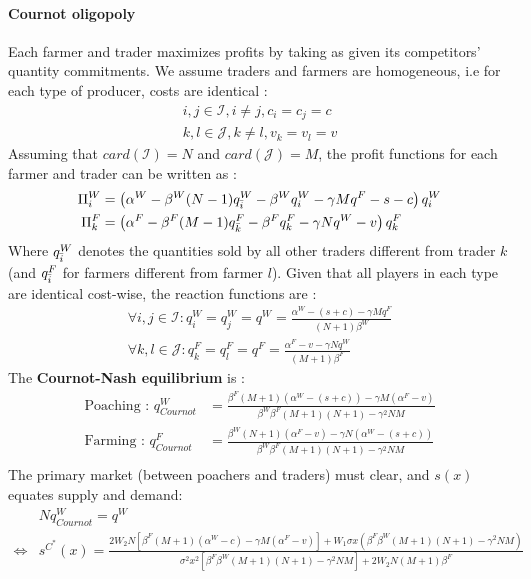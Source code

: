 \paragraph{Cournot oligopoly}
Each farmer and trader maximizes profits by taking as given its competitors' quantity commitments. We assume traders and farmers are homogeneous, i.e for each type of producer, costs are identical : 
\begin{align*}
    i,j \in \mathcal{I}, i\neq j, c_i = c_j = c\\
    k,l \in \mathcal{J}, k\neq l, v_k = v_l = v
\end{align*}
Assuming that $card(\mathcal{I}) = N$ and $card(\mathcal{J})=M$, the profit functions for each farmer and trader can be written as : 
\begin{align}
    \Pi_i^W &= \left(\alpha^W - \beta^W (N-1)q^W_{\Bar{i}} - \beta^W q_i^W - \gamma Mq^F - s - c \right)q_i^W\\
    \Pi_k^F &= \left(\alpha^F - \beta^F (M-1)q^F_{\Bar{k}} - \beta^F q_k^F - \gamma Nq^W - v \right)q_k^F
\end{align}
Where $q^W_{\Bar{i}}$ denotes the quantities sold by all other traders different from trader $k$ (and $q^F_{\Bar{i}}$ for farmers different from farmer $l$). 
Given that all players in each type are identical cost-wise, the reaction functions are : 
\begin{align}
   \forall i,j \in \mathcal{I}: q^W_i = q^W_j = q^W = \frac{\alpha^W - (s+c) - \gamma M q^F}{(N+1)\beta^W}\\
    \forall k,l \in \mathcal{J} : q^F_k = q^F_l = q^F = \frac{\alpha^F - v - \gamma N q^W}{(M+1)\beta^F}
\end{align}
The \textbf{Cournot-Nash equilibrium} is :
\begin{align}
    \text{Poaching : }q^W_{Cournot} &= \frac{\beta^F (M+1)(\alpha^W - (s+c)) - \gamma M (\alpha^F-v)}{\beta^W \beta^F (M+1)(N+1) - \gamma^2 NM}\\
    \text{Farming : } q^F_{Cournot} &= \frac{\beta^W (N+1) (\alpha^F-v) - \gamma N (\alpha^W - (s+c))}{\beta^W \beta^F (M+1)(N+1) - \gamma^2 NM}\\
\end{align}
%
The primary market (between poachers and traders) must clear, and $s(x)$ equates supply and demand: 
\begin{align}
    &Nq^W_{Cournot} = q^W \\
    \iff & s^{C^*}(x) = \frac{2W_2N\left[\beta^F (M+1) (\alpha^W-c) - \gamma M (\alpha^F - v)\right] + W_1 \sigma x (\beta^F \beta^W (M+1)(N+1) - \gamma^2 NM)}{\sigma^2 x^2 [\beta^F \beta^W (M+1) (N+1) - \gamma^2 NM] + 2W_2N(M+1)\beta^F}
\end{align}
